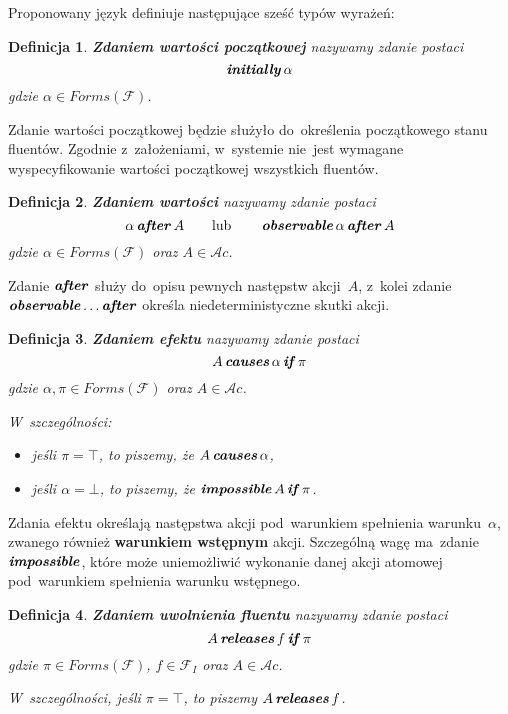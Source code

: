 \documentclass[11pt,a4paper]{article}
\newtheorem{defn}{Definicja}
\DeclareMathOperator{\Initially}{\textbf{\textit{initially}}}
\DeclareMathOperator{\After}{\textbf{\textit{after}}}
\DeclareMathOperator{\Observable}{\textbf{\textit{observable}}}
\DeclareMathOperator{\Causes}{\textbf{\textit{causes}}}
\DeclareMathOperator{\If}{\textbf{\textit{if}}}
\DeclareMathOperator{\Impossible}{\textbf{\textit{impossible}}}
\DeclareMathOperator{\Releases}{\textbf{\textit{releases}}}
\begin{document}
Proponowany język definiuje następujące sześć typów wyrażeń:

\begin{defn}
    \textbf{Zdaniem wartości początkowej} nazywamy zdanie postaci
    $$ \Initially \alpha $$
    gdzie $\alpha \in Forms(\mathcal{F})$.
\end{defn}

Zdanie wartości początkowej będzie służyło do~określenia początkowego stanu fluentów.
Zgodnie z~założeniami, w~systemie nie~jest wymagane wyspecyfikowanie wartości początkowej wszystkich fluentów.

\begin{defn}
    \textbf{Zdaniem wartości} nazywamy zdanie postaci
    $$ \alpha \After A \qquad \text{lub} \qquad \Observable \alpha \After A $$
    gdzie $\alpha \in Forms(\mathcal{F})$ oraz $A \in \mathcal{A}c$.
\end{defn}

Zdanie $\After$ służy do~opisu pewnych następstw akcji~$A$, z~kolei zdanie $\Observable \dots \After$ określa niedeterministyczne skutki akcji.

\begin{defn}
    \textbf{Zdaniem efektu} nazywamy zdanie postaci
    $$A \Causes \alpha \If \pi$$
    gdzie $\alpha, \pi \in Forms(\mathcal{F})$ oraz $A \in \mathcal{A}c$.

    W~szczególności:
    \begin{itemize}
        \item jeśli $\pi = \top$, to piszemy, że $A \Causes \alpha$,
        \item jeśli $\alpha = \bot$, to piszemy, że $\Impossible A \If \pi$.
    \end{itemize}
\end{defn}

Zdania efektu określają następstwa akcji pod~warunkiem spełnienia warunku~$\alpha$, zwanego również \textbf{warunkiem wstępnym} akcji.
Szczególną wagę ma~zdanie $\Impossible$, które może uniemożliwić wykonanie danej akcji atomowej pod~warunkiem spełnienia warunku wstępnego.

\begin{defn}
    \textbf{Zdaniem uwolnienia fluentu} nazywamy zdanie postaci
    $$ A \Releases f \If \pi $$
    gdzie $\pi \in Forms(\mathcal{F})$, $f \in \mathcal{F}_I$ oraz $A \in \mathcal{A}c$.

    W~szczególności, jeśli $\pi = \top$, to piszemy $A \Releases f$.
\end{defn}
\end{document}
